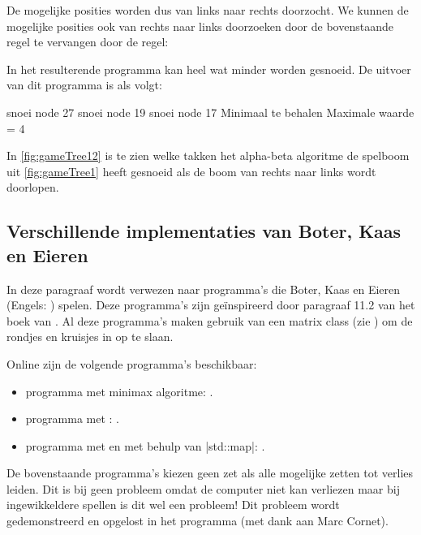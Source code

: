 \begin{cpplstShortInline}

De mogelijke posities worden dus van links naar rechts doorzocht.
We kunnen de mogelijke posities ook van rechts naar links doorzoeken door de bovenstaande regel te vervangen door de regel:


In het resulterende programma  kan heel wat minder worden gesnoeid.
De uitvoer van dit programma is als volgt:
\begin{coutput}
snoei node 27
snoei node 19
snoei node 17
Minimaal te behalen Maximale waarde = 4
\end{coutput}

In \cref{fig:gameTree12} is te zien welke takken het alpha\hyp{}beta algoritme de spelboom uit \cref{fig:gameTree1} heeft gesnoeid als de boom van rechts naar links wordt doorlopen.


\subsection{Verschillende implementaties van Boter, Kaas en Eieren}
In deze paragraaf wordt verwezen naar programma's die Boter, Kaas en Eieren (Engels: ) spelen.
Deze programma's zijn geïnspireerd door paragraaf 11.2 van het boek  van \citeauthor{Weiss1999}\cite{Weiss1999}.
Al deze programma's maken gebruik van een matrix class (zie ) om de rondjes en kruisjes in op te slaan.

Online zijn de volgende programma's beschikbaar:
\begin{itemize}
	\item {} programma met minimax algoritme: .
	\item {} programma met : .
	\item {} programma met  en  met behulp van |std::map|: .
\end{itemize}

De bovenstaande programma's kiezen geen zet als alle mogelijke zetten tot verlies leiden.
Dit is bij  geen probleem omdat de computer niet kan verliezen maar bij ingewikkeldere spellen is dit wel een probleem! Dit probleem wordt gedemonstreerd en opgelost in het programma  (met dank aan Marc Cornet).


\end{cpplstShortInline}
